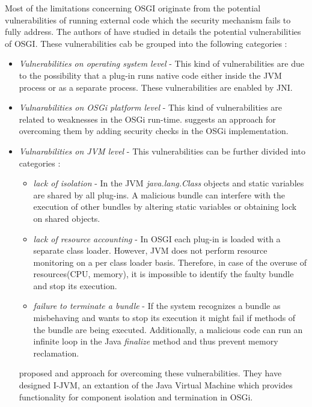 Most of the limitations concerning OSGI originate from the potential vulnerabilities of running external code which the security mechanism fails to fully address. The authors of \cite{Parrend} have studied in details the potential vulnerabilities of OSGI. These vulnerabilities cab be grouped into the following categories :

\begin{itemize}

	\item \textit{Vulnerabilities on operating system level} - This kind of vulnerabilities are due to the possibility that a plug-in runs native code either inside the JVM process or as a separate process. These vulnerabilities are enabled by JNI.
	
	\item \textit{Vulnarabilities on OSGi platform level} - This kind of vulnerabilities are related to weaknesses in the OSGi run-time. \cite{Parrend} suggests an approach for overcoming them by adding security checks in the OSGi implementation.
	
	\item \textit{Vulnarabilities on JVM level} - This vulnerabilities can be further divided into categories \cite{Geoffray}: 
	
	\begin{itemize}
		\item \textit{lack of isolation} - In the JVM \textit{java.lang.Class} objects and static variables are shared by all plug-ins. A malicious bundle can interfere with the execution of other bundles by altering static variables or obtaining lock on shared objects.
		
		\item \textit{lack of resource accounting} - In OSGI each plug-in is loaded with a separate class loader. However, JVM does not perform resource monitoring on a per class loader basis. Therefore, in case of the overuse of resources(CPU, memory), it is impossible to identify the faulty bundle and stop its execution.
		
		\item \textit{failure to terminate a bundle} -  If the system recognizes a bundle as misbehaving and wants to stop its
execution it might fail if methods of the bundle are being executed. Additionally, a malicious code can run an infinite loop in the Java \textit{finalize} method and thus prevent memory reclamation.
		
	\end{itemize}
	
	\cite{Geoffray} proposed and approach for overcoming these vulnerabilities. They have designed I-JVM, an extantion of the Java Virtual Machine which provides functionality for component isolation and termination in OSGi.
	
\end{itemize}


